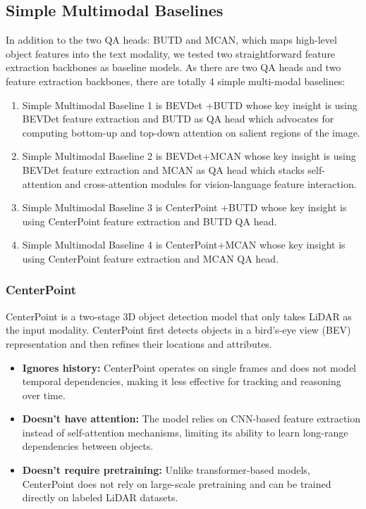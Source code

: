 \documentclass{article} %
\begin{document}
	
	\subsection{ Simple Multimodal Baselines}
	In addition to the two QA heads: BUTD and MCAN, which maps high-level object features into the text modality, we tested two straightforward feature extraction backbones as baseline models. As there are two QA heads and two feature extraction backbones, there are totally 4 simple multi-modal baselines:
	
	\begin{enumerate}
		\item Simple Multimodal Baseline 1 is BEVDet \cite{huang2021bevdet}+BUTD \cite{Anderson2017BottomUpAT} whose key insight is using BEVDet feature extraction and BUTD as QA head which advocates for computing bottom-up and top-down attention on salient regions of the image.
		\item Simple Multimodal Baseline 2 is BEVDet+MCAN \cite{Yu2019DeepMC} whose key insight is using BEVDet feature extraction and MCAN as QA head which stacks self-attention and cross-attention modules for vision-language feature interaction.
		\item Simple Multimodal Baseline 3 is CenterPoint \cite{yin2021centerpoint}+BUTD whose key insight is using CenterPoint feature extraction and BUTD QA head.
		\item Simple Multimodal Baseline 4 is CenterPoint+MCAN whose key insight is using CenterPoint feature extraction and MCAN QA head.
	\end{enumerate}
	
	
	
	\subsubsection{CenterPoint}
	CenterPoint is a two-stage 3D object detection model that only takes LiDAR as the input modality. CenterPoint first detects objects in a bird's-eye view (BEV) representation and then refines their locations and attributes.
	
	\begin{itemize}
		\item \textbf{Ignores history:} CenterPoint operates on single frames and does not model temporal dependencies, making it less effective for tracking and reasoning over time.
		\item \textbf{Doesn’t have attention:} The model relies on CNN-based feature extraction instead of self-attention mechanisms, limiting its ability to learn long-range dependencies between objects.
		\item \textbf{Doesn’t require pretraining:} Unlike transformer-based models, CenterPoint does not rely on large-scale pretraining and can be trained directly on labeled LiDAR  datasets.
	\end{itemize}
	
\end{document}
